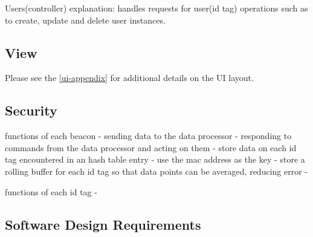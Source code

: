 Users(controller)
	explanation: handles requests for user(id tag) operations such as to create, update and delete user instances.

\subsection{View}
Please see the \ref{ui-appendix} for additional details on the UI layout.


\subsection{Security}


\bigskip

functions of each beacon
	- sending data to the data processor
	- responding to commands from the data processor and acting on them
	- store data on each id tag encountered in an hash table entry - use the mac address as the key
	- store a rolling buffer for each id tag so that data points can be averaged, reducing error
	-

\bigskip

functions of each id tag
	-




\pagebreak
\subsection{Software Design Requirements}